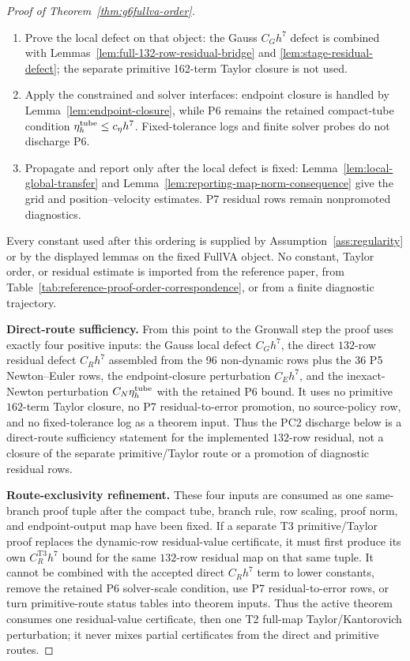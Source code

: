\documentclass[preprint,12pt]{elsarticle}
\begin{document}
\begin{proof}[Proof of Theorem~\ref{thm:g6fullva-order}]
\begin{enumerate}
  \(F_{A,h}\), row ordering, row scaling, proof norm, and endpoint-output map
  are fixed before any estimate or diagnostic row is used.  The reference
  correspondence table is an exposition map for this order of
  obligations; it is not itself a mathematical input.
  \item Prove the local defect on that object: the Gauss \(C_Gh^7\) defect is
  combined with Lemmas~\ref{lem:full-132-row-residual-bridge} and
  \ref{lem:stage-residual-defect}; the separate primitive 162-term Taylor
  closure is not used.
  \item Apply the constrained and solver interfaces: endpoint closure is
  handled by Lemma~\ref{lem:endpoint-closure}, while P6 remains the retained
  compact-tube condition \(\eta_h^{\rm tube}\le c_\eta h^7\). Fixed-tolerance
  logs and finite solver probes do not discharge P6.
  \item Propagate and report only after the local defect is fixed:
  Lemma~\ref{lem:local-global-transfer} and
  Lemma~\ref{lem:reporting-map-norm-consequence} give the grid and
  position--velocity estimates. P7 residual rows remain nonpromoted
  diagnostics.
\end{enumerate}
Every constant used after this ordering is supplied by
Assumption~\ref{ass:regularity} or by the displayed lemmas on the fixed
FullVA object.  No constant, Taylor order, or residual estimate is imported
from the reference paper, from Table~\ref{tab:reference-proof-order-correspondence},
or from a finite diagnostic trajectory.

\noindent\textbf{Direct-route sufficiency.}
From this point to the Gronwall step the proof uses exactly four positive
inputs: the Gauss local defect \(C_Gh^7\), the direct \(132\)-row residual
defect \(C_Rh^7\) assembled from the 96 non-dynamic rows plus the 36 P5
Newton--Euler rows, the endpoint-closure perturbation \(C_Eh^7\), and the
inexact-Newton perturbation \(C_N\eta_h^{\rm tube}\) with the retained P6
bound.  It uses no primitive \(162\)-term Taylor closure, no P7
residual-to-error promotion, no source-policy row, and no fixed-tolerance log
as a theorem input.  Thus the PC2 discharge below is a direct-route
sufficiency statement for the implemented \(132\)-row residual,
not a closure of the separate primitive/Taylor route or a promotion of
diagnostic residual rows.

\noindent\textbf{Route-exclusivity refinement.}
These four inputs are consumed as one same-branch proof tuple after the
compact tube, branch rule, row scaling, proof norm, and endpoint-output map
have been fixed.  If a separate T3 primitive/Taylor proof replaces the
dynamic-row residual-value certificate, it must first produce its own
\(C_R^{\mathrm{T3}}h^7\) bound for the same \(132\)-row residual map on that
same tuple.  It cannot be combined with the accepted direct \(C_Rh^7\) term to
lower constants, remove the retained P6 solver-scale condition, use P7
residual-to-error rows, or turn primitive-route status tables into theorem
inputs.  Thus the active theorem consumes one residual-value certificate,
then one T2 full-map Taylor/Kantorovich perturbation; it never mixes partial
certificates from the direct and primitive routes.


\end{proof}
\end{document}
